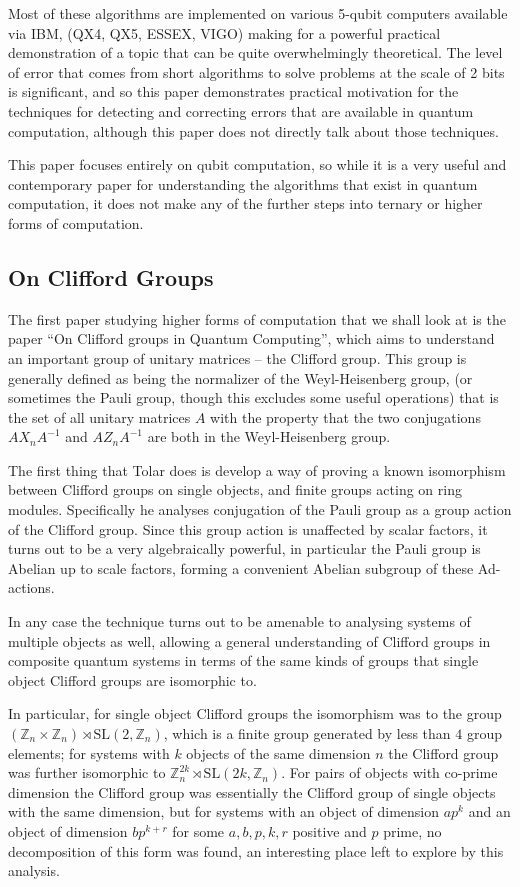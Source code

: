 Most of these algorithms are implemented on various 5-qubit computers available via IBM, (QX4, QX5, ESSEX, VIGO) making for a powerful practical demonstration of a topic that can be quite overwhelmingly theoretical. The level of error that comes from short algorithms to solve problems at the scale of 2 bits is significant, and so this paper demonstrates practical motivation for the techniques for detecting and correcting errors that are available in quantum computation, although this paper does not directly talk about those techniques.

This paper focuses entirely on qubit computation, so while it is a very useful and contemporary paper for understanding the algorithms that exist in quantum computation, it does not make any of the further steps into ternary or higher forms of computation.
\subsection{On Clifford Groups}
The first paper studying higher forms of computation that we shall look at is the paper ``On Clifford groups in Quantum Computing''\cite{tolar-clifford}, which aims to understand an important group of unitary matrices -- the Clifford group. This group is generally defined as being the normalizer of the Weyl-Heisenberg group, (or sometimes the Pauli group, though this excludes some useful operations) that is the set of all unitary matrices $A$ with the property that the two conjugations $AX_nA^{-1}$ and $AZ_nA^{-1}$ are both in the Weyl-Heisenberg group.

The first thing that Tolar does is develop a way of proving a known isomorphism between Clifford groups on single objects, and finite groups acting on ring modules. Specifically he analyses conjugation of the Pauli group as a group action of the Clifford group. Since this group action is unaffected by scalar factors, it turns out to be a very algebraically powerful, in particular the Pauli group is Abelian up to scale factors, forming a convenient Abelian subgroup of these Ad-actions.

In any case the technique turns out to be amenable to analysing systems of multiple objects as well, allowing a general understanding of Clifford groups in composite quantum systems in terms of the same kinds of groups that single object Clifford groups are isomorphic to.

In particular, for single object Clifford groups the isomorphism was to the group $(\mathbb{Z}_n\times\mathbb{Z}_n)\rtimes\text{SL}(2,\mathbb{Z}_n)$, which is a finite group generated by less than $4$ group elements; for systems with $k$ objects of the same dimension $n$ the Clifford group was further isomorphic to $\mathbb{Z}_n^{2k}\rtimes\text{SL}(2k, \mathbb{Z}_n)$. For pairs of objects with co-prime dimension the Clifford group was essentially the Clifford group of single objects with the same dimension, but for systems with an object of dimension $ap^k$ and an object of dimension $bp^{k+r}$ for some $a, b, p, k, r$ positive and $p$ prime, no decomposition of this form was found, an interesting place left to explore by this analysis.

